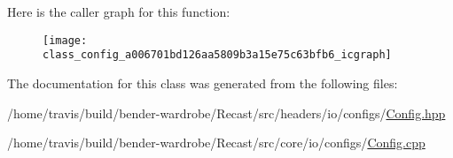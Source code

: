 Here is the caller graph for this function\-:
\nopagebreak
\begin{figure}[H]
\begin{center}
\leavevmode
\texttt{[image: class\_config\_a006701bd126aa5809b3a15e75c63bfb6\_icgraph]}
\end{center}
\end{figure}




The documentation for this class was generated from the following files\-:\begin{DoxyCompactItemize}
\item 
/home/travis/build/bender-\/wardrobe/\-Recast/src/headers/io/configs/\hyperlink{_config_8hpp}{Config.\-hpp}\item 
/home/travis/build/bender-\/wardrobe/\-Recast/src/core/io/configs/\hyperlink{_config_8cpp}{Config.\-cpp}\end{DoxyCompactItemize}
